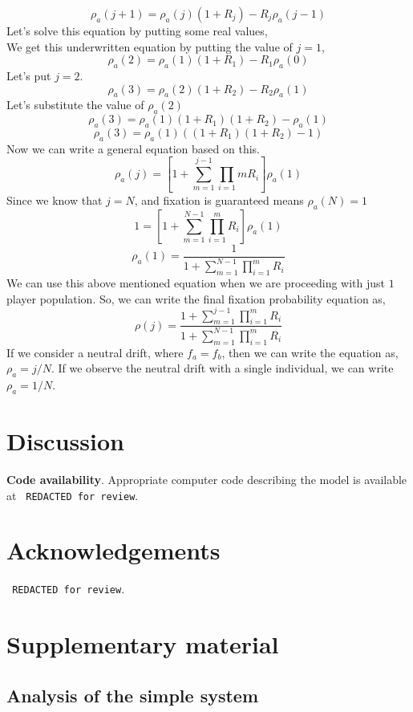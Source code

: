 \documentclass{article}
\begin{document}
 \[\rho_a(j+1)={\rho_a(j)(1+R_j)-R_j\rho_a(j-1)}\]
 Let's solve this equation by putting some real values,\\
 We get this underwritten equation by putting the value of $j=1$,
 \[\rho_a(2)= \rho_a(1)(1+R_1)-R_1\rho_a(0)\]
 Let's put $j=2$.
 \[\rho_a(3)=\rho_a(2)(1+R_2)-R_2\rho_a(1)\]
 Let's substitute the value of $\rho_a(2)$
 \[\rho_a(3)=\rho_a(1)(1+R_1)(1+R_2)-\rho_a(1)\]
 \[\rho_a(3)=\rho_a(1)((1+R_1)(1+R_2)-1)\]
 Now we can write a general equation based on this.
 \[\rho_a(j)=\left[1+\sum_{m=1}^{j-1}\prod_{i=1}{m}R_i \right] \rho_a(1)\]
 Since we know that $j=N$, and fixation is guaranteed means $\rho_a(N)=1$
 \[1=\left[1+\sum_{m=1}^{N-1}\prod_{i=1}^{m} R_i\right]\rho_a(1)\]
 \[\rho_a(1)=\frac{1}{1+\sum_{m=1}^{N-1}\prod_{i=1}^{m}R_i}\]
 We can use this above mentioned equation when we are proceeding with just $1$ player population.
 So, we can write the final fixation probability equation as,
 \[\rho(j)=\frac{1+\sum_{m=1}^{j-1}\prod_{i=1}^{m}R_i}{1+\sum_{m=1}^{N-1}\prod_{i=1}^{m}R_i}\]
 If we consider a neutral drift, where $f_a=f_b$, then we can write the equation as, $\rho_a={j}/{N}$.
 If we observe the neutral drift with a single individual, we can write $\rho_a=1/N$.








\section{Discussion}


\textbf{Code availability}.
Appropriate computer code describing the model is available at 
\texttt{ REDACTED for review}.%

\section{Acknowledgements}
\texttt{ REDACTED for review}.%





\renewcommand{\theequation}{SI.\arabic{equation}}
\setcounter{equation}{0}

\renewcommand{\thefigure}{SI.\arabic{figure}}
\setcounter{figure}{0}

\section{Supplementary material}


\subsection{Analysis of the simple system}
\end{document}
